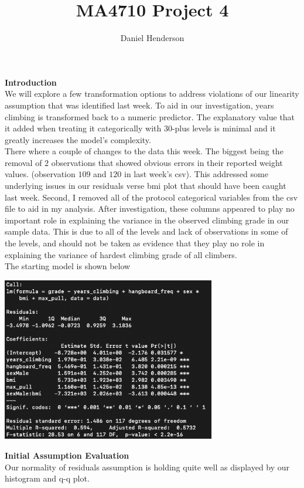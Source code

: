 \documentclass[11pt]{amsart}
\title{MA4710 Project 4}
\author{Daniel Henderson}
\begin{document}
\maketitle

{\bf\large Introduction}\\
We will explore a few transformation options to address violations of our linearity assumption that was identified last week.
To aid in our investigation, years climbing is transformed back to a numeric predictor.
The explanatory value that it added when treating it categorically with $30$-plus levels is minimal and it greatly increases the model's complexity.
\\

There where a couple of changes to the data this week.
The biggest being the removal of $2$ observations that showed obvious errors in their reported weight values. (observation $109$ and $120$ in last week's csv).
This addressed some underlying issues in our residuals verse bmi plot that should have been caught last week.
Second, I removed all of the protocol categorical variables from the csv file to aid in my analysis.
After investigation, these columns appeared to play no important role in explaining the variance in the observed climbing grade in our sample data.
This is due to all of the levels and lack of observations in some of the levels, and should not be taken as evidence that they play no role in explaining the variance of hardest climbing grade of all climbers.\\

The starting model is shown below\\
\begin{center}
\includegraphics[width=0.7\textwidth]{start}
\end{center}

\newpage
{\bf\large Initial Assumption Evaluation}\\
Our normality of residuals assumption is holding quite well as displayed by our histogram and q-q plot.\\
\end{document}
